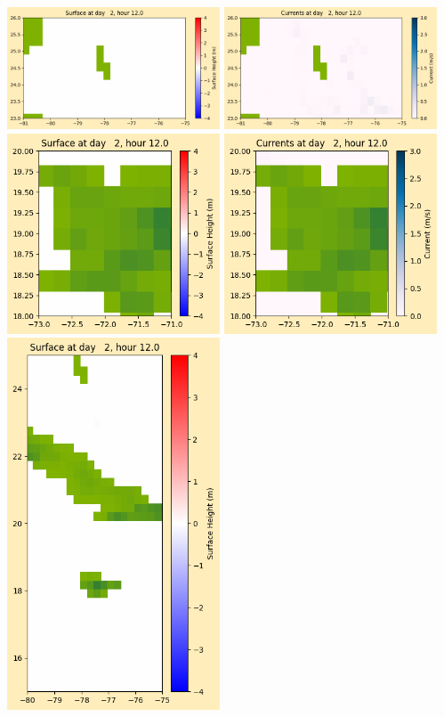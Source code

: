 \documentclass[11pt]{article}
\begin{document}
\vskip 10pt 
\includegraphics[width=0.475\textwidth]{frame0022fig1003.png}
\includegraphics[width=0.475\textwidth]{frame0022fig1004.png}
\vskip 10pt 
\includegraphics[width=0.475\textwidth]{frame0022fig1005.png}
\includegraphics[width=0.475\textwidth]{frame0022fig1006.png}
\vskip 10pt 
\includegraphics[width=0.475\textwidth]{frame0022fig1007.png}
\end{document}
